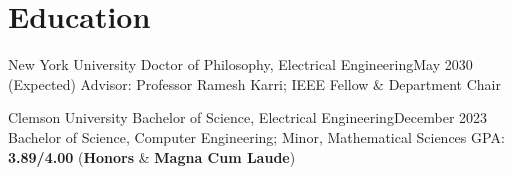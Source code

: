 \section{\textbf{Education}}
\vspace{-0.4mm}
\resumeSubHeadingListStart

\resumePhDSubheading
{New York University}{}
{Doctor of Philosophy, Electrical Engineering}{May 2030 (Expected)}
{Advisor: Professor Ramesh Karri; IEEE Fellow \& Department Chair}

\resumeBSSubheading
{Clemson University}{}
{Bachelor of Science, Electrical Engineering}{December 2023}
{Bachelor of Science, Computer Engineering; Minor, Mathematical Sciences}
{GPA: \textbf{3.89/4.00} (\textbf{Honors} \& \textbf{Magna Cum Laude})}

\resumeSubHeadingListEnd
\vspace{-6mm}
